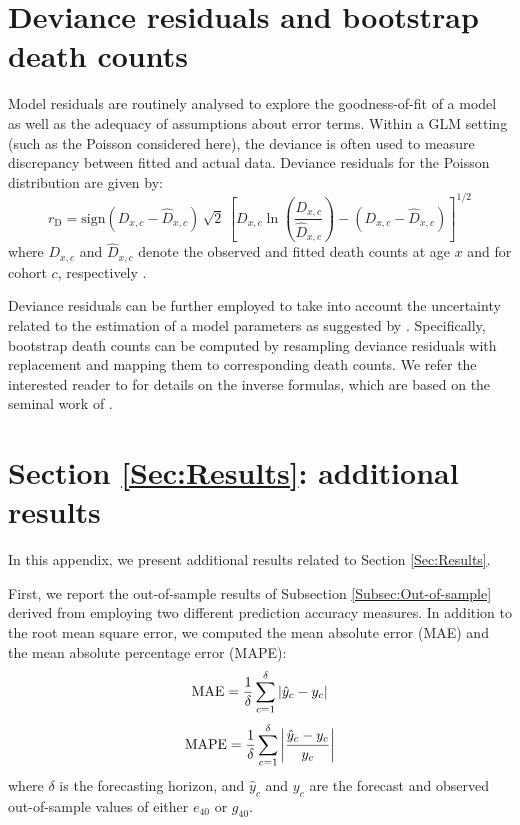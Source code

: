 \documentclass[11pt, a4paper]{article}
\begin{document}
\section{Deviance residuals and bootstrap death counts}
\label{Appendix:ResidualDeath}     
Model residuals are routinely analysed to explore the goodness-of-fit of a model as well as the adequacy of assumptions about error terms. Within a GLM setting (such as the Poisson considered here), the deviance is often used to measure discrepancy between fitted and actual data. Deviance residuals for the Poisson distribution are given by: 
\begin{equation}\label{Eq:DevRes}
r_{\mathrm{D}}= \mathrm{sign} (D_{x,c}-\hat{D}_{x,c}) \, \sqrt{2} \, 
\left[D_{x,c} \ln \left(\frac{D_{x,c}}{\hat{D}_{x,c}}\right) - 
\left(D_{x,c}-\hat{D}_{x,c}\right)
\right]^{1/2}
\end{equation}
where $D_{x,c}$ and $\hat{D}_{x,c}$ denote the observed and fitted death counts at age $x$ and for cohort $c$, respectively \citep{mccullagh1989glm}. 

Deviance residuals can be further employed to take into account the uncertainty related to the estimation of a model parameters as suggested by \cite{koissi2006evaluating}. Specifically, bootstrap death counts can be computed by resampling deviance residuals with replacement and mapping them to corresponding death counts. We refer the interested reader to \cite{renshaw2008simulation} for details on the inverse formulas, which are based on the seminal work of \cite{efron1994introduction}.  

\section{Section \ref{Sec:Results}: additional results}
\label{Appendix:AdditResults}     

In this appendix, we present additional results related to Section \ref{Sec:Results}. 

First, we report the out-of-sample results of Subsection \ref{Subsec:Out-of-sample} derived from employing two different prediction accuracy measures. In addition to the root mean square error, we computed the mean absolute error (MAE) and the mean absolute percentage error (MAPE):
%
\begin{equation}\label{Eq:MAE}
\mathrm{MAE} = \frac{1}{\delta} \sum_{c=1}^{\delta} \left| \hat{y}_c - y_c \right|  \notag 
\end{equation} 
%
\begin{equation}\label{Eq:MAPE}
\mathrm{MAPE}= \frac{1}{\delta}  \sum_{c=1}^{\delta} \left| \frac{\hat{y}_c - y_c}{y_c}  \right|  \notag
\end{equation} 
%
where $\delta$ is the forecasting horizon, and $\hat{y}_c$ and $y_c$ are the forecast and observed out-of-sample values of either $e_{40}$ or $g_{40}$. 
\end{document}
